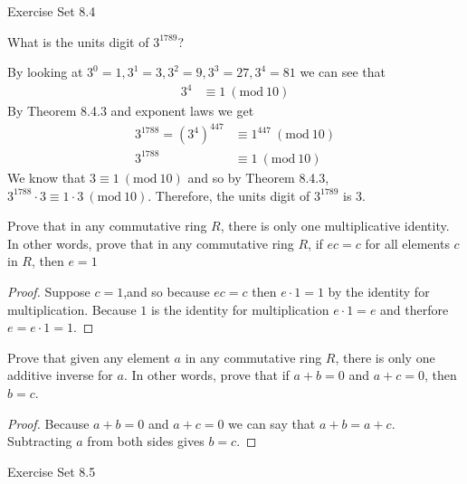 \documentclass[12pt,letterpaper, onecolumn]{exam}
\newcommand{\Mod}[1]{\ (\mathrm{mod}\ #1)}
\begin{document}
	\centerline{Exercise Set 8.4}
	\begin{questions}
		\setcounter{question}{15}\question What is the units digit of $3^{1789}$?
		\begin{solution}
			By looking at $3^0=1, 3^1=3,3^2=9,3^3=27,3^4=81$ we can see that
			\begin{align*}
 				 3^4 &\equiv 1 \Mod{10}
			\end{align*}
			By Theorem 8.4.3 and exponent laws we get
				\begin{align*}
				3^{1788}=(3^4)^{447} &\equiv 1^{447} \Mod{10}\\
				3^{1788}&\equiv1\Mod{10}
			\end{align*}
			We know that $3\equiv1\Mod{10}$ and so by Theorem 8.4.3, $3^{1788}\cdot3\equiv 1\cdot3\Mod{10}$. Therefore, the units digit of $3^{1789}$ is 3.
		\end{solution}
		\setcounter{question}{31}\question Prove that in any commutative ring $R$, there is only one multiplicative identity. In other words, prove that in any commutative ring $R$, if $ec=c$ for all elements $c$ in $R$, then $e=1$
		\begin{solution}
			\begin{proof}
			Suppose $c=1$,and so because $ec=c$ then $e\cdot1=1$ by the identity for multiplication. Because $1$ is the identity for multiplication $e\cdot1=e$ and therfore $e=e\cdot1=1$.
			\end{proof}
		\end{solution}
		\setcounter{question}{32}\question Prove that given any element $a$ in any commutative ring $R$, there is only one additive inverse for $a$. In other words, prove that if $a+b=0$ and $a+c=0$, then $b=c$.
		\begin{solution}
			\begin{proof}
			Because $a+b=0$ and $a+c=0$ we can say that $a+b=a+c$. Subtracting $a$ from both sides gives $b=c$.
			\end{proof}
		\end{solution}
	\end{questions}
	\centerline{Exercise Set 8.5}
\end{document}
